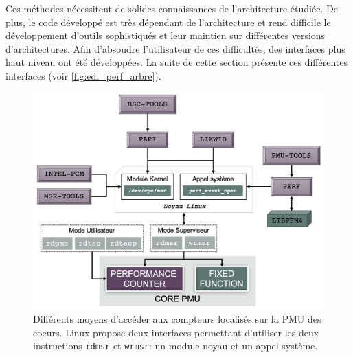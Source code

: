         Ces méthodes nécessitent de solides connaissances de l'architecture étudiée. De plus, le code développé est très dépendant de l'architecture et rend difficile le développement d'outils sophistiqués et leur maintien sur différentes versions d'architectures. Afin d'absoudre l'utilisateur de ces difficultés, des interfaces plus haut niveau ont été développées. La suite de cette section présente ces différentes interfaces (voir \autoref{fig:edl_perf_arbre}).
            
            \begin{figure}[ht]
            \center
            \includegraphics[width=14cm]{images/edl_perf_arbre.png}
            \caption{\label{fig:edl_perf_arbre} Différents moyens d'accéder aux compteurs localisés sur la PMU des coeurs. Linux propose deux interfaces permettant d'utiliser les deux instructions \texttt{rdmsr} et \texttt{wrmsr}: un module noyau et un appel système.}
            \end{figure}
           
